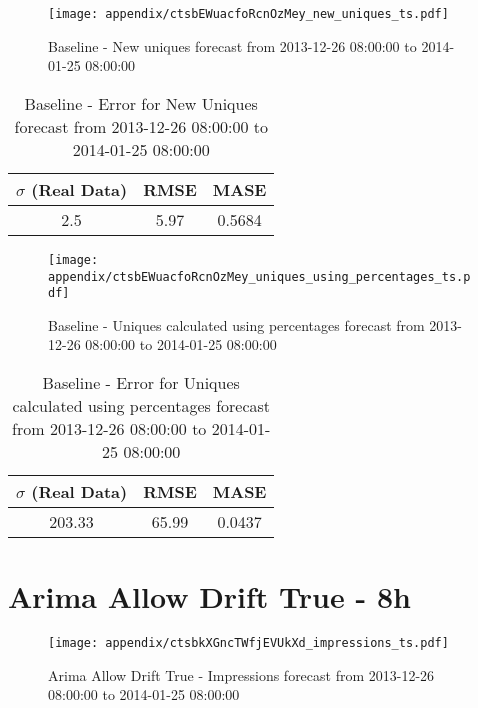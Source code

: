 \begin{figure}[H] \begin{center} \leavevmode
\texttt{[image: appendix/ctsbEWuacfoRcnOzMey\_new\_uniques\_ts.pdf]} \caption{
Baseline - New uniques forecast from 2013-12-26 08:00:00 to 2014-01-25 08:00:00} \label{fig:appendix/ctsbEWuacfoRcnOzMey_new_uniques_ts.pdf} \end{center}
\end{figure}

\begin{table}[H]
\centering
\footnotesize
\begin{tabular}{ccc}
$\sigma$ (Real Data) & RMSE & MASE   \\ \hline
2.5 & 5.97 & 0.5684 \\
\end{tabular}

\vspace{0.5cm}

\caption{
Baseline - Error for New Uniques forecast from 2013-12-26 08:00:00 to 2014-01-25 08:00:00}
\end{table}

\begin{figure}[H] \begin{center} \leavevmode
\texttt{[image: appendix/ctsbEWuacfoRcnOzMey\_uniques\_using\_percentages\_ts.pdf]} \caption{
Baseline - Uniques calculated using percentages forecast from 2013-12-26 08:00:00 to 2014-01-25 08:00:00} \label{fig:appendix/ctsbEWuacfoRcnOzMey_uniques_using_percentages_ts.pdf} \end{center}
\end{figure}

\begin{table}[H]
\centering
\footnotesize
\begin{tabular}{ccc}
$\sigma$ (Real Data) & RMSE & MASE   \\ \hline
203.33 & 65.99 & 0.0437 \\
\end{tabular}

\vspace{0.5cm}

\caption{
Baseline - Error for Uniques calculated using percentages forecast from 2013-12-26 08:00:00 to 2014-01-25 08:00:00}
\end{table}

\section{Arima Allow Drift True - 8h}
\begin{figure}[H] \begin{center} \leavevmode
\texttt{[image: appendix/ctsbkXGncTWfjEVUkXd\_impressions\_ts.pdf]} \caption{
Arima Allow Drift True - Impressions forecast from 2013-12-26 08:00:00 to 2014-01-25 08:00:00} \label{fig:appendix/ctsbkXGncTWfjEVUkXd_impressions_ts.pdf} \end{center}
\end{figure}

